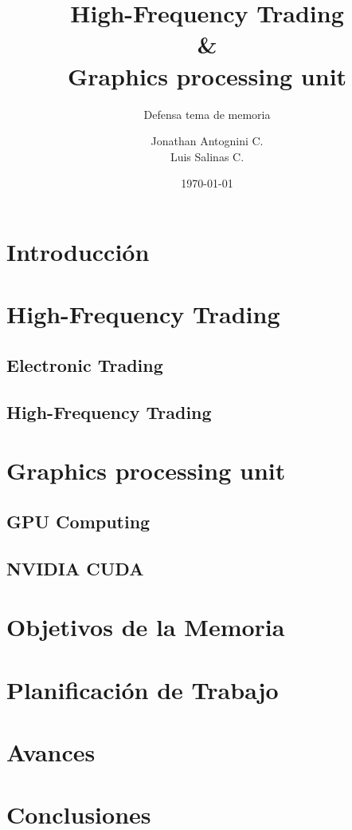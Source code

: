 \documentclass{beamer}
\title{High-Frequency Trading \\ \& \\ Graphics processing unit}
\subtitle{Defensa tema de memoria}
\author{Jonathan Antognini C.\\
		Luis Salinas C.}
\institute[]{Universidad Técnica Federico Santa María}
\date{\today}
\begin{document}
    \frame{\titlepage}
    \frame{\tableofcontents}
	\section{Introducción}
		
	\section{High-Frequency Trading}
		
		\subsection{Electronic Trading}
			
		\subsection{High-Frequency Trading}
			
	\section{Graphics processing unit}
		
		\subsection{GPU Computing}
			
		\subsection{NVIDIA CUDA}
			
	\section{Objetivos de la Memoria}
		
	\section{Planificación de Trabajo}
		
	\section{Avances}
		
	\section{Conclusiones}
		
\end{document}
